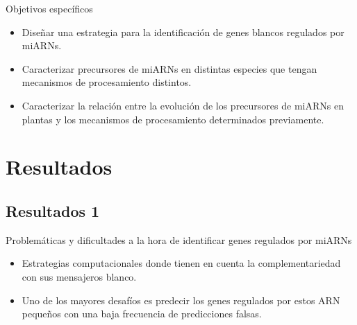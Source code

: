 \documentclass{beamer}
\begin{document}
\begin{frame}{Objetivos específicos}
		\pause
		\begin{itemize}
            \item<-2> Diseñar una estrategia para la identificación de genes blancos regulados por miARNs.
			\item<-1> Caracterizar precursores de miARNs en distintas especies que tengan mecanismos de procesamiento distintos.
			\item<-1> Caracterizar la relación entre la evolución de los precursores de miARNs en plantas y los mecanismos de procesamiento determinados previamente.
        \end{itemize}
\end{frame}


\section{Resultados}

\subsection{Resultados 1}



\begin{frame}{Problemáticas y dificultades a la hora de identificar genes regulados por miARNs}
	\begin{itemize}
		\item Estrategias computacionales donde tienen en cuenta la complementariedad con sus mensajeros blanco.
        \item Uno de los mayores desafíos es predecir los genes regulados por estos ARN pequeños con una baja frecuencia de predicciones falsas.
	\end{itemize}
\end{frame}
\end{document}
